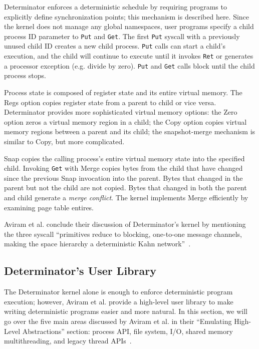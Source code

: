 Determinator enforces a deterministic schedule by requiring programs to
explicitly define synchronization points; this mechanism is described here.
Since the kernel does not manage any global namespaces, user programs specify
a child process ID parameter to {\tt Put} and {\tt Get}. The first {\tt Put}
syscall with a previously unused child ID creates a new child process.
{\tt Put} calls can start a child's execution, and the child will continue to
execute until it invokes {\tt Ret} or generates a processor exception (e.g.
divide by zero). {\tt Put} and {\tt Get} calls block until the child process
stops.

Process state is composed of register state and its entire virtual memory.
The Regs option copies register state from a parent to child or vice versa.
Determinator provides more sophisticated virtual memory options: the Zero
option zeros a virtual memory region in a child; the Copy option copies
virtual memory regions between a parent and its child; the snapshot-merge
mechanism is similar to Copy, but more complicated.

Snap copies the calling process's entire virtual memory state into the specified
child. Invoking {\tt Get} with Merge copies bytes
from the child that have changed since the previous Snap invocation into the
parent. Bytes that changed in the parent but not the child are not copied. Bytes
that changed in both the parent and child generate a \emph{merge conflict}.
The kernel implements Merge efficiently by examining page table entires.

Aviram et al. conclude their discussion of Determinator's kernel by mentioning
the three syscall ``primitives reduce to blocking, one-to-one message channels,
making the space hierarchy a deterministic Kahn
network''~\cite{Aviram10,kahn1974semantics}.

\subsection{Determinator's User Library}

The Determinator kernel alone is enough to enforce deterministic program
execution; however, Aviram et al. provide a high-level user library to make
writing deterministic programs easier and more natural. In this section, we will
go over
the five main areas discussed by Aviram et al. in their ``Emulating High-Level
Abstractions'' section: process API, file
system, I/O, shared memory multithreading, and legacy thread APIs~\cite{Aviram10}.

